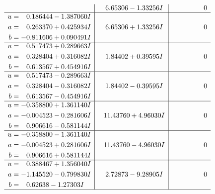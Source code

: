 \documentclass[1p]{elsarticle_modified}
\theoremstyle{definition}
\begin{document}
$$\begin{array}{c|c|c}
 & \phantom{-}6.65306 - 1.33256 I & \phantom{-0.000000 } 0 \\ \hline\begin{aligned}
u &= \phantom{-}0.186444 - 1.387060 I \\
a &= \phantom{-}0.263370 + 0.425934 I \\
b &= -0.811606 + 0.090491 I\end{aligned}
 & \phantom{-}6.65306 + 1.33256 I & \phantom{-0.000000 } 0 \\ \hline\begin{aligned}
u &= \phantom{-}0.517473 + 0.289663 I \\
a &= \phantom{-}0.328404 + 0.316082 I \\
b &= \phantom{-}0.613567 + 0.454916 I\end{aligned}
 & \phantom{-}1.84402 + 0.39595 I & \phantom{-0.000000 } 0 \\ \hline\begin{aligned}
u &= \phantom{-}0.517473 - 0.289663 I \\
a &= \phantom{-}0.328404 - 0.316082 I \\
b &= \phantom{-}0.613567 - 0.454916 I\end{aligned}
 & \phantom{-}1.84402 - 0.39595 I & \phantom{-0.000000 } 0 \\ \hline\begin{aligned}
u &= -0.358800 + 1.361140 I \\
a &= -0.004523 - 0.281606 I \\
b &= \phantom{-}0.906616 - 0.581144 I\end{aligned}
 & \phantom{-}11.43760 + 4.96030 I & \phantom{-0.000000 } 0 \\ \hline\begin{aligned}
u &= -0.358800 - 1.361140 I \\
a &= -0.004523 + 0.281606 I \\
b &= \phantom{-}0.906616 + 0.581144 I\end{aligned}
 & \phantom{-}11.43760 - 4.96030 I & \phantom{-0.000000 } 0 \\ \hline\begin{aligned}
u &= \phantom{-}0.388467 + 1.356040 I \\
a &= -1.145520 - 0.799830 I \\
b &= \phantom{-}0.62638 - 1.27303 I\end{aligned}
 & \phantom{-}2.72873 - 9.28905 I & \phantom{-0.000000 } 0\\
 \hline 
 \end{array}$$\newpage$$\begin{array}{c|c|c}  

\end{array}$$
\end{document}
